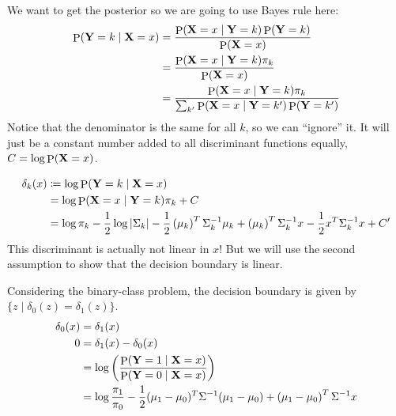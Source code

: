 \documentclass[letterpaper,12pt]{article}
\theoremstyle{plain}
\theoremstyle{definition}
\theoremstyle{remark}
\def\P{\mathop{\mathrm{P}}}
\begin{document}
We want to get the posterior so we are going to use Bayes rule here:
\begin{align*}
    \P(\rmY = k \mid \rmX = x) & = \frac{\P(\rmX = x \mid \rmY = k) \P(\rmY = k)}{\P(\rmX = x)}                                 \\
                               & = \frac{\P(\rmX = x \mid \rmY = k) \pi_k}{\P(\rmX = x)}                                        \\
                               & = \frac{\P(\rmX = x \mid \rmY = k) \pi_k}{\sum_{k'} \P(\rmX = x \mid \rmY = k') \P(\rmY = k')}
\end{align*}
Notice that the denominator is the same for all $k$, so we can ``ignore'' it.
%
It will just be a constant number added to all discriminant functions equally, $C = \log \P(\rmX = x)$.

\begin{align}
    \delta_k(x) & \coloneqq \log \P(\rmY = k \mid \rmX = x)              \nonumber                                                                                                                                 \\
                & = \log \P(\rmX = x \mid \rmY = k) \pi_k    + C        \nonumber                                                                                                                                  \\
                & = \log \pi_k - \frac{1}{2} \log \left| \Sigma_k \right| - \frac{1}{2} \left( \mu_k \right)^T \Sigma_k^{-1} \mu_k + \left( \mu_k \right)^T \Sigma_k^{-1} x - \frac{1}{2} x^T \Sigma_k^{-1} x + C'
\end{align}
This discriminant is actually not linear in $x$! But we will use the second assumption to show that the decision boundary is linear.

Considering the binary-class problem, the decision boundary is given by $\{z \mid \delta_0(z) = \delta_1(z) \}$.
\begin{align}
    \delta_0(x) & =  \delta_1(x)                                                                                                                        \\
    0           & = \delta_1(x) - \delta_0(x)                                                                                                           \\
                & = \log \left(\frac{\P(\rmY = 1 \mid \rmX = x)}{\P(\rmY = 0 \mid \rmX = x)}\right)                                                     \\
                & = \log \frac{\pi_1}{\pi_0} - \frac{1}{2} (\mu_1 - \mu_0)^T \Sigma^{-1} (\mu_1 - \mu_0) + \left( \mu_1 - \mu_0 \right)^T \Sigma^{-1} x
\end{align}
\end{document}
